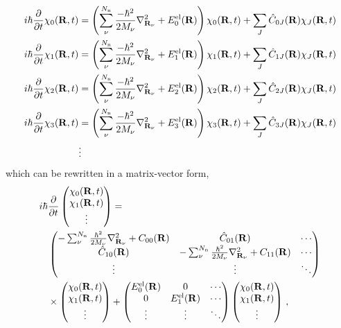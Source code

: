 \documentclass[9pt,bestpractices,pubversion]{livecoms}
\begin{document}
\begin{align}
i\hbar\frac{\partial}{\partial t} \chi_0(\mathbf{R},t) & = \left(\sum_\nu^{N_{\text{n}}}\frac{-\hbar^2}{2M_\nu} \nabla_{\mathbf{R}_\nu}^2 + E^{\text{el}}_{0}(\mathbf{R})\right)\chi_0(\mathbf{R},t) + \sum_J \hat{C}_{0J}(\mathbf{R}) \chi_J(\mathbf{R},t) \notag \\
i\hbar\frac{\partial}{\partial t} \chi_1(\mathbf{R},t) & = \left(\sum_\nu^{N_{\text{n}}}\frac{-\hbar^2}{2M_\nu} \nabla_{\mathbf{R}_\nu}^2 + E^{\text{el}}_{1}(\mathbf{R})\right)\chi_1(\mathbf{R},t) + \sum_J \hat{C}_{1J}(\mathbf{R}) \chi_J(\mathbf{R},t) \notag \\
i\hbar\frac{\partial}{\partial t} \chi_2(\mathbf{R},t) & = \left(\sum_\nu^{N_{\text{n}}}\frac{-\hbar^2}{2M_\nu} \nabla_{\mathbf{R}_\nu}^2 + E^{\text{el}}_{2}(\mathbf{R})\right)\chi_2(\mathbf{R},t) + \sum_J \hat{C}_{2J}(\mathbf{R}) \chi_J(\mathbf{R},t) \notag \\
i\hbar\frac{\partial}{\partial t} \chi_3(\mathbf{R},t) & = \left(\sum_\nu^{N_{\text{n}}}\frac{-\hbar^2}{2M_\nu} \nabla_{\mathbf{R}_\nu}^2 + E^{\text{el}}_{3}(\mathbf{R})\right)\chi_3(\mathbf{R},t) + \sum_J \hat{C}_{3J}(\mathbf{R}) \chi_J(\mathbf{R},t) \notag \\
& \vdots
\end{align}
which can be rewritten in a matrix-vector form,
\begin{align} 
 i\hbar & \frac{\partial}{\partial t} 
     \begin{pmatrix}
        \chi_0(\mathbf{R},t)  \\
        \chi_1(\mathbf{R},t) \\
        \vdots
    \end{pmatrix} =  \notag \\
   & \begin{pmatrix}
        -\sum_\nu^{N_{\text{n}}}\frac{\hbar^2}{2M_\nu} \nabla_{\mathbf{R}_\nu}^2 + C_{00}(\mathbf{R})  & \hat{C}_{01}(\mathbf{R}) & \cdots \\
        \hat{C}_{10}(\mathbf{R}) & -\sum_\nu^{N_{\text{n}}}\frac{\hbar^2}{2M_\nu} \nabla_{\mathbf{R}_\nu}^2 + C_{11}(\mathbf{R}) & \cdots  \\
        \vdots & \vdots & \ddots
    \end{pmatrix}  \notag \\
    & \times \begin{pmatrix}
        \chi_0(\mathbf{R},t)  \\
        \chi_1(\mathbf{R},t) \\
        \vdots
    \end{pmatrix} + 
    \begin{pmatrix}
        E^{\text{el}}_{0}(\mathbf{R})   & 0 & \cdots \\
        0 & E^{\text{el}}_{1}(\mathbf{R})  & \cdots  \\
        \vdots & \vdots & \ddots
    \end{pmatrix} 
    \begin{pmatrix}
        \chi_0(\mathbf{R},t)  \\
        \chi_1(\mathbf{R},t) \\
        \vdots
    \end{pmatrix}
    \, ,
\label{eq:matrixtdse}
\end{align}
\end{document}
